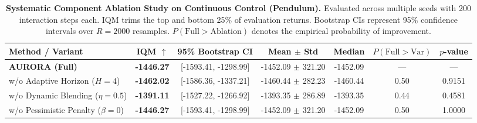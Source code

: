 \begin{table}[t]
\centering
\small
\caption{\textbf{Systematic Component Ablation Study on Continuous Control (Pendulum).} Evaluated across multiple seeds with 200 interaction steps each. IQM trims the top and bottom 25\% of evaluation returns. Bootstrap CIs represent 95\% confidence intervals over $R=2000$ resamples. $P(\text{Full} > \text{Ablation})$ denotes the empirical probability of improvement.}
\label{tab:ablation_results}
\begin{tabular}{lcccccc}
\toprule
\textbf{Method / Variant} & \textbf{IQM} $\uparrow$ & \textbf{95\% Bootstrap CI} & \textbf{Mean} $\pm$ \textbf{Std} & \textbf{Median} & $P(\text{Full} > \text{Var})$ & $p$-value \\
\midrule
\textbf{AURORA (Full)} & \textbf{-1446.27} & [-1593.41, -1298.99] & -1452.09 $\pm$ 321.20 & -1452.09 & --- & --- \\
w/o Adaptive Horizon ($H=4$) & \textbf{-1462.02} & [-1586.36, -1337.21] & -1460.44 $\pm$ 282.23 & -1460.44 & 0.50 & 0.9151 \\
w/o Dynamic Blending ($\eta=0.5$) & \textbf{-1391.11} & [-1527.22, -1266.92] & -1393.35 $\pm$ 286.89 & -1393.35 & 0.44 & 0.4581 \\
w/o Pessimistic Penalty ($\beta=0$) & \textbf{-1446.27} & [-1593.41, -1298.99] & -1452.09 $\pm$ 321.20 & -1452.09 & 0.50 & 1.0000 \\
\bottomrule
\end{tabular}
\end{table}
